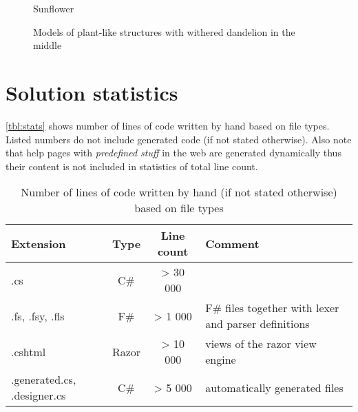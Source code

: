 \begin{figure}[p]
	\centering
	\caption{Sunflower}
\end{figure}

\begin{figure}[p]
	\hfill
	\hfill
	\caption{Models of plant-like structures with withered dandelion in the middle}
\end{figure}



\section{Solution statistics}

\autoref{tbl:stats} shows number of lines of code written by hand based on file types.
Listed numbers do not include generated code (if not stated otherwise).
Also note that help pages with \emph{predefined stuff} in the web are generated dynamically thus their content is not included in statistics of total line count.


\begin{table}[h]
	\centering
	\begin{tabular}{p{65pt} c c p{200pt}}
   		\toprule
   		Extension & Type & Line count & Comment\\
   		\midrule
		.cs & C\# & > 30 000 &  \\ \hline
		.fs, .fsy, .fls & F\# & > 1 000 & F\# files together with lexer and parser definitions \\ \hline
		.cshtml & Razor & > 10 000 & views of the razor view engine\\ \hline
		.generated.cs, .designer.cs & C\# & > 5 000 & automatically generated files \\ \hline
		\bottomrule
	\end{tabular}
	\caption{Number of lines of code written by hand (if not stated otherwise) based on file types}
	\label{tbl:stats}
\end{table}
























